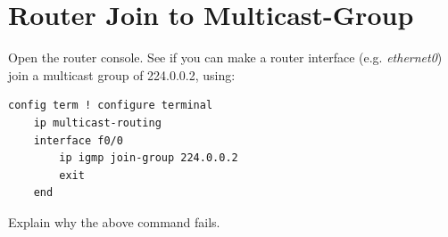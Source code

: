 \documentclass{../UTNetLab}
\begin{document}
\section{Router Join to Multicast-Group}
Open the router console.
See if you can make a router interface (e.g. \textit{ethernet0}) join a multicast group of 224.0.0.2, using:

\begin{lstlisting}[language={cisco}]
config term ! configure terminal
    ip multicast-routing
    interface f0/0
        ip igmp join-group 224.0.0.2
        exit
    end
\end{lstlisting}

\begin{report}
    \item Explain why the above command fails.
\end{report}
\end{document}
